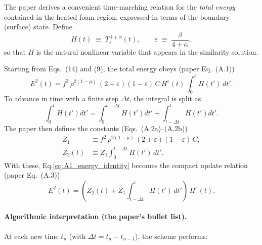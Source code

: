 \documentclass{article}
\begin{document}
The paper derives a convenient time-marching relation for the \emph{total energy} contained in the heated foam region, expressed in terms of the boundary (surface) state. Define
\begin{equation}
H(t) \;\equiv\; T_s^{\,4+\alpha}(t),
\qquad
\varepsilon \;\equiv\; \frac{\beta}{4+\alpha},
\end{equation}
so that $H$ is the natural nonlinear variable that appears in the similarity solution.

Starting from Eqs.~(14) and (9), the total energy obeys (paper Eq.~(A.1))
\begin{equation}
E^2(t)
=
f^2\,\rho^{2(1-\mu)}\,(2+\varepsilon)(1-\varepsilon)\,C\,
H^{\varepsilon}(t)\,
\int_{0}^{t} H(t')\,dt'.
\label{eq:A1_energy_identity}
\end{equation}
To advance in time with a finite step $\Delta t$, the integral is split as
\begin{equation}
\int_{0}^{t} H(t')dt'
=
\int_{0}^{t-\Delta t} H(t')dt'
+
\int_{t-\Delta t}^{t} H(t')dt'.
\end{equation}
The paper then defines the constants (Eqs.~(A.2a)--(A.2b))
\begin{align}
Z_1 &\equiv f^2\,\rho^{2(1-\mu)}\,(2+\varepsilon)(1-\varepsilon)\,C, \label{eq:Z1_def}\\
Z_2(t) &\equiv Z_1 \int_{0}^{t-\Delta t} H(t')\,dt'. \label{eq:Z2_def}
\end{align}
With these, Eq.\eqref{eq:A1_energy_identity} becomes the compact update relation (paper Eq.~(A.3))
\begin{equation}
E^2(t)
=
\left(
Z_2(t) + Z_1\int_{t-\Delta t}^{t} H(t')\,dt'
\right)\,H^{\varepsilon}(t).
\label{eq:A3_compact}
\end{equation}

\paragraph{Algorithmic interpretation (the paper's bullet list).}
At each new time $t_n$ (with $\Delta t = t_n-t_{n-1}$), the scheme performs:
\end{document}
